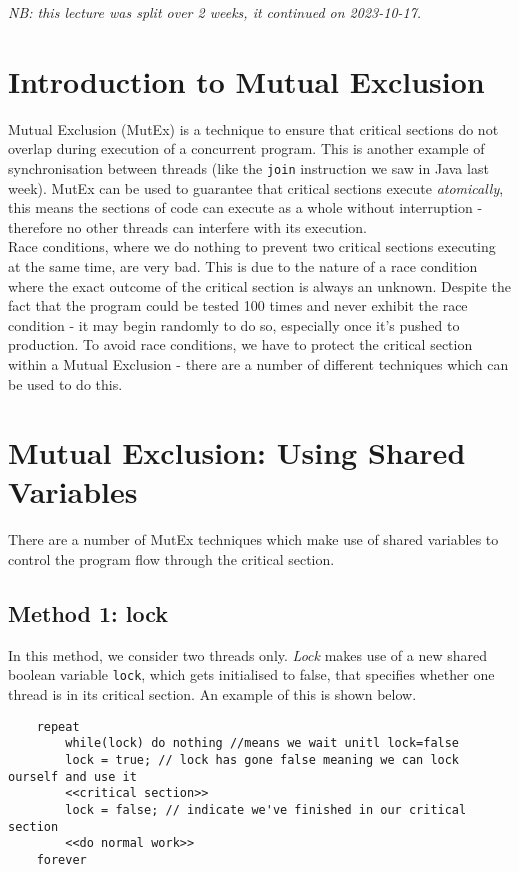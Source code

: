 
\textit{NB: this lecture was split over 2 weeks, it continued on 2023-10-17.}

\section{Introduction to Mutual Exclusion}
Mutual Exclusion (MutEx) is a technique to ensure that critical sections do not overlap during execution of a concurrent program. This is another example of synchronisation between threads (like the \verb|join| instruction we saw in Java last week). MutEx can be used to guarantee that critical sections execute \textit{atomically}, this means the sections of code can execute as a whole without interruption - therefore no other threads can interfere with its execution.\\

Race conditions, where we do nothing to prevent two critical sections executing at the same time, are very bad. This is due to the nature of a race condition where the exact outcome of the critical section is always an unknown. Despite the fact that the program could be tested 100 times and never exhibit the race condition - it may begin randomly to do so, especially once it's pushed to production. To avoid race conditions, we have to protect the critical section within a Mutual Exclusion - there are a number of different techniques which can be used to do this.

\section{Mutual Exclusion: Using Shared Variables}
There are a number of MutEx techniques which make use of shared variables to control the program flow through the critical section.

\subsection{Method 1: lock}
In this method, we consider two threads only. \textit{Lock} makes use of a new shared boolean variable \verb|lock|, which gets initialised to false, that specifies whether one thread is in its critical section. An example of this is shown below.
\begin{verbatim}
    repeat
        while(lock) do nothing //means we wait unitl lock=false
        lock = true; // lock has gone false meaning we can lock ourself and use it
        <<critical section>>
        lock = false; // indicate we've finished in our critical section
        <<do normal work>>
    forever
\end{verbatim}

